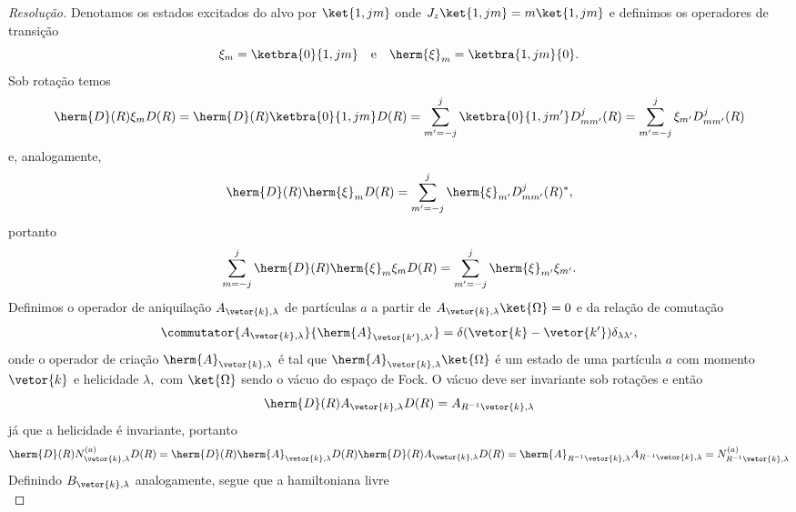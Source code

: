 \begin{proof}[Resolução]
   Denotamos os estados excitados do alvo por \(\ket{1,jm}\) onde \(J_z\ket{1,jm} = m\ket{1,jm}\) e definimos os operadores de transição
   \begin{equation*}
      \xi_m = \ketbra{0}{1,jm}\quad\text{e}\quad \herm{\xi}_m = \ketbra{1,jm}{0}.
   \end{equation*}
   Sob rotação temos
   \begin{equation*}
      \herm{D}(R) \xi_m D(R) = \herm{D}(R) \ketbra{0}{1,jm} D(R) = \sum_{m' = -j}^{j}\ketbra{0}{1,jm'} D^{j}_{mm'}(R) = \sum_{m' = -j}^{j} \xi_{m'} D^{j}_{mm'}(R)
   \end{equation*}
   e, analogamente,
   \begin{equation*}
      \herm{D}(R) \herm{\xi}_m D(R) = \sum_{m' = -j}^j \herm{\xi}_{m'} D^j_{m m'}(R)^*,
   \end{equation*}
   portanto
   \begin{equation*}
      \sum_{m = -j}^{j} \herm{D}(R) \herm{\xi}_m\xi_m D(R) = \sum_{m' = - j}^{j} \herm{\xi}_{m'} \xi_{m'}.
   \end{equation*}
   Definimos o operador de aniquilação \(A_{\vetor{k},\lambda}\) de partículas \(a\) a partir de \(A_{\vetor{k}, \lambda} \ket{\Omega} = 0\) e da relação de comutação
   \begin{equation*}
      \commutator{A_{\vetor{k},\lambda}}{\herm{A}_{\vetor{k'}, \lambda'}} = \delta(\vetor{k} - \vetor{k'}) \delta_{\lambda\lambda'},
   \end{equation*}
   onde o operador de criação \(\herm{A}_{\vetor{k}, \lambda}\) é tal que \(\herm{A}_{\vetor{k}, \lambda}\ket{\Omega}\) é um estado de uma partícula \(a\) com momento \(\vetor{k}\) e helicidade \(\lambda,\) com \(\ket{\Omega}\) sendo o vácuo do espaço de Fock. O vácuo deve ser invariante sob rotações e então
   \begin{equation*}
      \herm{D}(R) A_{\vetor{k},\lambda} D(R) = A_{R^{-1}\vetor{k}, \lambda}
   \end{equation*}
   já que a helicidade é invariante, portanto
   \begin{equation*}
      \herm{D}(R)N^{(a)}_{\vetor{k}, \lambda}D(R) = \herm{D}(R)\herm{A}_{\vetor{k}, \lambda}D(R) \herm{D}(R) A_{\vetor{k},\lambda} D(R) = \herm{A}_{R^{-1}\vetor{k}, \lambda} A_{R^{-1} \vetor{k},\lambda} = N^{(a)}_{R^{-1}\vetor{k}, \lambda}
   \end{equation*}
   Definindo \(B_{\vetor{k},\lambda}\) analogamente, segue que a hamiltoniana livre
   \begin{equation*}

\end{equation*}
\end{proof}
